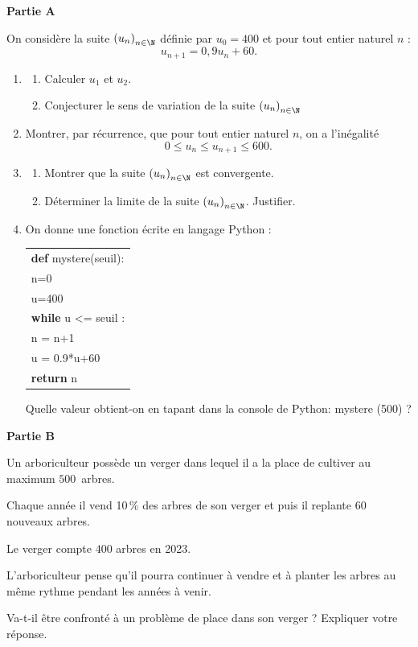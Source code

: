 \medskip

\textbf{Partie A}

\medskip

On considère la suite $\left(u_n\right)_{n\in \N}$ définie par $u_0 = 400$ et pour tout entier naturel $n$ : 
\[u_{n+1} = 0,9u_n + 60.\]

\begin{enumerate}
\item
	\begin{enumerate}
		\item Calculer $u_1$ et $u_2$.
		\item Conjecturer le sens de variation de la suite $\left(u_n\right)_{n\in \N}$
	\end{enumerate}	
\item Montrer, par récurrence, que pour tout entier naturel $n$, on a l'inégalité 
\[0  \leqslant u_n  \leqslant u_{n+1} \leqslant  600.\]
\item 
	\begin{enumerate}
		\item Montrer que la suite $\left(u_n\right)_{n\in \N}$ est convergente.
		\item Déterminer la limite de la suite $\left(u_n\right)_{n\in \N}$. Justifier.
	\end{enumerate}
\item On donne une fonction écrite en langage Python :

\begin{center}
\begin{tabularx}{0.4\linewidth}{|X|}\hline
\textbf{def} mystere(seuil):\\
\qquad n=0\\
\qquad u=400\\
\qquad \textbf{while} u <= seuil :\\
\qquad \qquad n = n+1\\
\qquad \qquad u = 0.9*u+60\\
\qquad \textbf{return} n\\ \hline
\end{tabularx}
\end{center}

Quelle valeur obtient-on en tapant dans la console de Python: mystere (500) ?
\end{enumerate}

\medskip

\textbf{Partie B}

\medskip

Un arboriculteur possède un verger dans lequel il a la place de cultiver au maximum $500$~arbres.

Chaque année il vend 10\,\% des arbres de son verger et puis il replante $60$ nouveaux arbres.

Le verger compte $400$ arbres en 2023.

L'arboriculteur pense qu'il pourra continuer à vendre et à planter les arbres au même rythme pendant les années à venir.

Va-t-il être confronté à un problème de place dans son verger ? Expliquer votre réponse.
